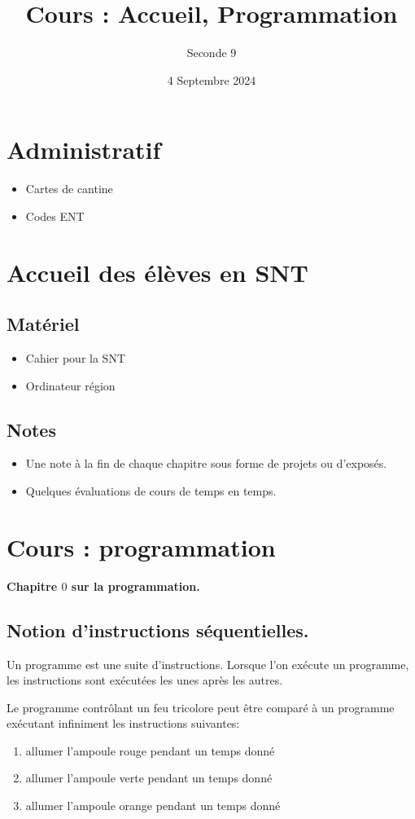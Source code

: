 \documentclass{article}
\title{Cours : Accueil, Programmation}
\date{4 Septembre 2024}
\author{Seconde 9}
\begin{document}
\maketitle

\section{Administratif}
\begin{itemize}
\item Cartes de cantine
\item Codes ENT
\end{itemize}
\section{Accueil des élèves en SNT}
\subsection{Matériel}
\begin{itemize}
\item Cahier pour la SNT
\item Ordinateur région
\end{itemize}
\subsection{Notes}
\begin{itemize}
\item Une note à la fin de chaque chapitre sous forme de projets ou d'exposés.
\item Quelques évaluations de cours de temps en temps.
\end{itemize}

\section{Cours : programmation}

\textbf{Chapitre $0$ sur la programmation.}

\subsection{Notion d'instructions séquentielles.}

\begin{definition}
Un programme est une suite d'instructions. Lorsque l'on exécute un programme, les instructions sont exécutées les unes après les autres.
\end{definition}
\begin{example}
Le programme contrôlant un feu tricolore peut être comparé à un programme exécutant infiniment les instructions suivantes: 
\begin{enumerate}
\item allumer l'ampoule rouge pendant un temps donné
\item allumer l'ampoule verte pendant un temps donné
\item allumer l'ampoule orange pendant un temps donné
\end{enumerate}
\end{example}
\end{document}
